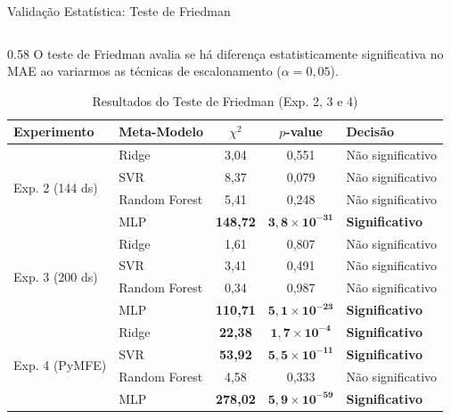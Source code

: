 \documentclass[aspectratio=169, 10pt]{beamer}
\begin{document}
\begin{frame}{Validação Estatística: Teste de Friedman}
  \begin{columns}[T]
    \begin{column}{0.58\textwidth}
      \small
      O teste de Friedman avalia se há diferença estatisticamente significativa no MAE ao variarmos as técnicas de escalonamento ($\alpha = 0,05$).
      \vspace{0.1cm}
      \begin{table}
        \centering
        \caption{Resultados do Teste de Friedman (Exp. 2, 3 e 4)}
        \tiny
        \begin{tabular}{llccl}
          \toprule
          \textbf{Experimento} & \textbf{Meta-Modelo} & \textbf{$\chi^2$} & \textbf{$p$-value} & \textbf{Decisão} \\
          \midrule
          \multirow{4}{*}{Exp. 2 (144 ds)}
           & Ridge        & 3,04            & 0,551            & Não significativo \\
           & SVR          & 8,37            & 0,079            & Não significativo \\
           & Random Forest & 5,41           & 0,248            & Não significativo \\
           & MLP          & \textbf{148,72} & $\mathbf{3{,}8 \times 10^{-31}}$ & \textbf{Significativo} \\
          \midrule
          \multirow{4}{*}{Exp. 3 (200 ds)}
           & Ridge        & 1,61            & 0,807            & Não significativo \\
           & SVR          & 3,41            & 0,491            & Não significativo \\
           & Random Forest & 0,34           & 0,987            & Não significativo \\
           & MLP          & \textbf{110,71} & $\mathbf{5{,}1 \times 10^{-23}}$ & \textbf{Significativo} \\
          \midrule
          \multirow{4}{*}{Exp. 4 (PyMFE)}
           & Ridge        & \textbf{22,38}  & $\mathbf{1{,}7 \times 10^{-4}}$  & \textbf{Significativo} \\
           & SVR          & \textbf{53,92}  & $\mathbf{5{,}5 \times 10^{-11}}$ & \textbf{Significativo} \\
           & Random Forest & 4,58           & 0,333            & Não significativo \\
           & MLP          & \textbf{278,02} & $\mathbf{5{,}9 \times 10^{-59}}$ & \textbf{Significativo} \\
          \bottomrule
        \end{tabular}
      \end{table}
    \end{column}
    

\end{columns}
\end{frame}
\end{document}
